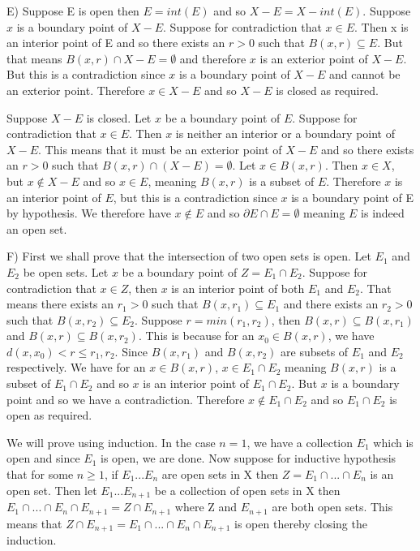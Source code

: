 \documentclass[12pt]{article}
\begin{document}
E) Suppose E is open then $E=int(E)$ and so $X-E = X-int(E)$. Suppose $x$ is a boundary point of $X-E$. Suppose for contradiction that $ x\in E$. Then x is an interior point of E and so there exists an $r>0$ such that $B(x,r) \subseteq E$. But that means $B(x,r)\cap X-E= \emptyset$ and therefore $x$ is an exterior point of $X-E$. But this is a contradiction since $x$ is a boundary point of $X-E$ and cannot be an exterior point. Therefore $x\in X-E$ and so $X-E$ is closed as required.

Suppose $X-E$ is closed. Let $x$ be a boundary point of $E$. Suppose for contradiction that $x\in E$. Then $x$ is neither an interior or a boundary point of $X-E$. This means that it must be an exterior point of $X-E$ and so there exists an $r>0$ such that $B(x,r)\cap(X-E) = \emptyset$. Let $x\in B(x,r)$. Then $x\in X$, but $x\notin X-E$ and so $x\in E$, meaning $B(x,r)$ is a subset of $E$. Therefore $x$ is an interior point of $E$, but this is a contradiction since $x$ is a boundary point of E by hypothesis. We therefore have $ x\notin E$ and so $\partial E \cap E = \emptyset$ meaning $E$ is indeed an open set. 

F) First we shall prove that the intersection of two open sets is open. Let $E_1$ and $E_2$ be open sets. Let $x$ be a boundary point of $ Z=E_1\cap E_2$. Suppose for contradiction that $x\in Z$, then $x$ is an interior point of both $E_1$ and $E_2$. That means there exists an $r_1>0$ such that $B(x,r_1) \subseteq E_1$ and there exists an $r_2>0$ such that $B(x,r_2) \subseteq E_2$. Suppose $r = min(r_1,r_2)$, then $B(x,r)\subseteq B(x,r_1)$ and $B(x,r)\subseteq B(x,r_2)$. This is because for an $x_0\in B(x,r)$, we have $d(x,x_0) < r \leq r_1,r_2$. Since $B(x,r_1)$ and $B(x,r_2)$ are subsets of $E_1$ and $E_2$ respectively. We have for an $x\in B(x,r)$, $x\in E_1\cap E_2$ meaning $B(x,r)$ is a subset of $E_1\cap E_2$ and so $x$ is an interior point of $E_1\cap E_2$. But $x$ is a boundary point and so we have a contradiction. Therefore $x\notin E_1\cap E_2$ and so $E_1\cap E_2$ is open as required.

We will prove using induction. In the case $n=1$, we have a collection $E_1$ which is open and since $E_1$ is open, we are done. Now suppose for inductive hypothesis that for some $n\geq 1$, if $E_1...E_n$ are open sets in X then $Z=E_1\cap...\cap E_n$ is an open set. Then let $E_1...E_{n+1}$ be a collection of open sets in X then $E_1\cap...\cap E_n\cap E_{n+1} = Z\cap E_{n+1}$ where Z and $E_{n+1}$ are both open sets. This means that $ Z\cap E_{n+1}=E_1\cap...\cap E_n\cap E_{n+1}$ is open thereby closing the induction.
\end{document}
